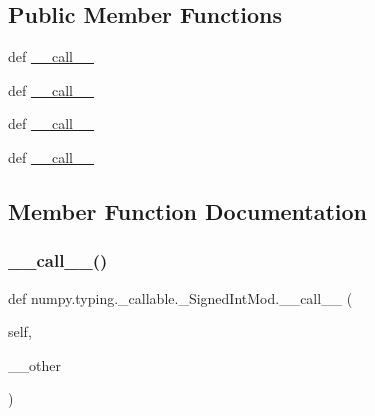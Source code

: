 \subsection*{Public Member Functions}
\begin{DoxyCompactItemize}
\item 
def \hyperlink{classnumpy_1_1typing_1_1__callable_1_1__SignedIntMod_aed79bb9d26e69a856e7def476c963a89}{\+\_\+\+\_\+call\+\_\+\+\_\+}
\item 
def \hyperlink{classnumpy_1_1typing_1_1__callable_1_1__SignedIntMod_aed79bb9d26e69a856e7def476c963a89}{\+\_\+\+\_\+call\+\_\+\+\_\+}
\item 
def \hyperlink{classnumpy_1_1typing_1_1__callable_1_1__SignedIntMod_aed79bb9d26e69a856e7def476c963a89}{\+\_\+\+\_\+call\+\_\+\+\_\+}
\item 
def \hyperlink{classnumpy_1_1typing_1_1__callable_1_1__SignedIntMod_aed79bb9d26e69a856e7def476c963a89}{\+\_\+\+\_\+call\+\_\+\+\_\+}
\end{DoxyCompactItemize}


\subsection{Member Function Documentation}
\mbox{\label{classnumpy_1_1typing_1_1__callable_1_1__SignedIntMod_aed79bb9d26e69a856e7def476c963a89}} 
\subsubsection{\texorpdfstring{\+\_\+\+\_\+call\+\_\+\+\_\+()}{\_\_call\_\_()}\hspace{0.1cm}{\footnotesize\ttfamily [1/4]}}
{\footnotesize\ttfamily def numpy.\+typing.\+\_\+callable.\+\_\+\+Signed\+Int\+Mod.\+\_\+\+\_\+call\+\_\+\+\_\+ (\begin{DoxyParamCaption}\item[{}]{self,  }\item[{}]{\+\_\+\+\_\+other }\end{DoxyParamCaption})}

